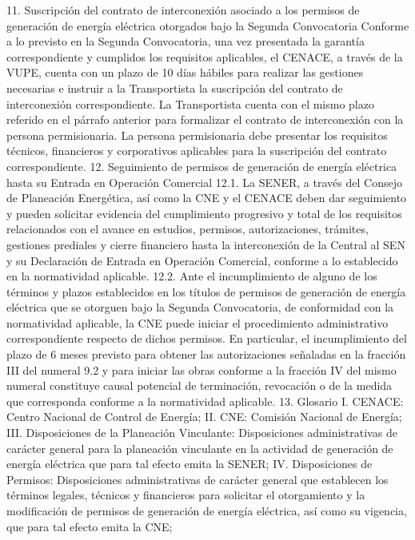 11. Suscripción del contrato de interconexión asociado a los permisos de generación de energía eléctrica otorgados bajo la Segunda Convocatoria
Conforme a lo previsto en la Segunda Convocatoria, una vez presentada la garantía correspondiente y cumplidos los requisitos aplicables, el CENACE, a través de la VUPE, cuenta con un plazo de 10 días hábiles para realizar las gestiones necesarias e instruir a la Transportista la suscripción del contrato de interconexión correspondiente.
La Transportista cuenta con el mismo plazo referido en el párrafo anterior para formalizar el contrato de interconexión con la persona permisionaria. La persona permisionaria debe presentar los requisitos técnicos, financieros y corporativos aplicables para la suscripción del contrato correspondiente.
12. Seguimiento de permisos de generación de energía eléctrica hasta su Entrada en Operación Comercial
12.1. La SENER, a través del Consejo de Planeación Energética, así como la CNE y el CENACE deben dar seguimiento y pueden solicitar evidencia del cumplimiento progresivo y total de los requisitos relacionados con el avance en estudios, permisos, autorizaciones, trámites, gestiones prediales y cierre financiero hasta la interconexión de la Central al SEN y su Declaración de Entrada en Operación Comercial, conforme a lo establecido en la normatividad aplicable.
12.2. Ante el incumplimiento de alguno de los términos y plazos establecidos en los títulos de permisos de generación de energía eléctrica que se otorguen bajo la Segunda Convocatoria, de conformidad con la normatividad aplicable, la CNE puede iniciar el procedimiento administrativo correspondiente respecto de dichos permisos. En particular, el incumplimiento del plazo de 6 meses previsto para obtener las autorizaciones señaladas en la fracción III del numeral 9.2 y para iniciar las obras conforme a la fracción IV del mismo numeral constituye causal potencial de terminación, revocación o de la medida que corresponda conforme a la normatividad aplicable.
13. Glosario
I. CENACE: Centro Nacional de Control de Energía;
II. CNE: Comisión Nacional de Energía;
III. Disposiciones de la Planeación Vinculante: Disposiciones administrativas de carácter general para la planeación vinculante en la actividad de generación de energía eléctrica que para tal efecto emita la SENER;
IV. Disposiciones de Permisos: Disposiciones administrativas de carácter general que establecen los términos legales, técnicos y financieros para solicitar el otorgamiento y la modificación de permisos de generación de energía eléctrica, así como su vigencia, que para tal efecto emita la CNE;
